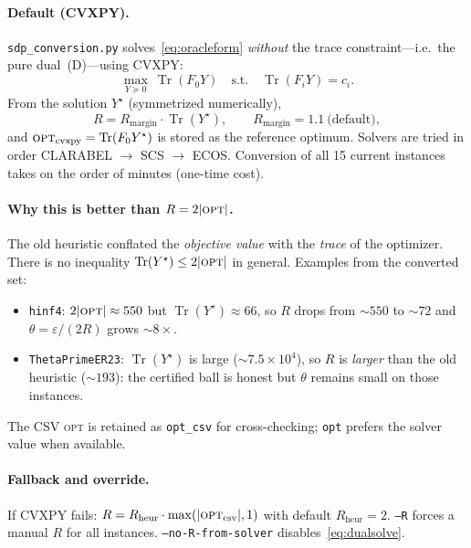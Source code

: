 \documentclass[11pt]{article}
\newcommand{\Tr}{\operatorname{Tr}}
\newcommand{\PSD}{\succeq 0}
\newcommand{\eps}{\varepsilon}
\begin{document}
\paragraph{Default (CVXPY).}
\texttt{sdp\_conversion.py} solves~\eqref{eq:oracleform} \emph{without} the
trace constraint---i.e.\ the pure dual~(D)---using CVXPY:
\begin{equation}
\label{eq:dualsolve}
\max_{Y\PSD}\ \Tr(F_0 Y)\quad\text{s.t.}\quad \Tr(F_i Y)=c_i .
\end{equation}
From the solution $Y^\star$ (symmetrized numerically),
\begin{equation}
\label{eq:Rcvxpy}
R = R_{\mathrm{margin}}\cdot \Tr(Y^\star),
\qquad R_{\mathrm{margin}}=1.1\ \text{(default)},
\end{equation}
and $\textsc{opt}_{\mathrm{cvxpy}}=\Tr(F_0 Y^\star)$ is stored as the reference
optimum. Solvers are tried in order CLARABEL $\to$ SCS $\to$ ECOS. Conversion of
all 15 current instances takes on the order of minutes (one-time cost).

\paragraph{Why this is better than $R=2|\textsc{opt}|$.}
The old heuristic conflated the \emph{objective value} with the \emph{trace} of
the optimizer. There is no inequality $\Tr(Y^\star)\le 2|\textsc{opt}|$ in
general. Examples from the converted set:
\begin{itemize}
  \item \texttt{hinf4}: $2|\textsc{opt}|\approx 550$ but $\Tr(Y^\star)\approx
  66$, so $R$ drops from ${\sim}550$ to ${\sim}72$ and
  $\theta=\eps/(2R)$ grows ${\sim}8\times$.
  \item \texttt{ThetaPrimeER23}: $\Tr(Y^\star)$ is large (${\sim}7.5\times
  10^4$), so $R$ is \emph{larger} than the old heuristic (${\sim}193$): the
  certified ball is honest but $\theta$ remains small on those instances.
\end{itemize}
The CSV \textsc{opt} is retained as \texttt{opt\_csv} for cross-checking;
\texttt{opt} prefers the solver value when available.

\paragraph{Fallback and override.}
If CVXPY fails: $R = R_{\mathrm{heur}}\cdot\max(|\textsc{opt}_{\mathrm{csv}}|,1)$
with default $R_{\mathrm{heur}}=2$. \texttt{--R} forces a manual $R$ for all
instances. \texttt{--no-R-from-solver} disables~\eqref{eq:dualsolve}.
\end{document}

